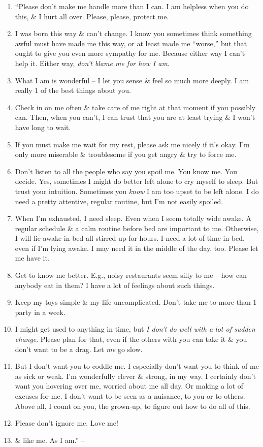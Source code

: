 \documentclass{article}
\numberwithin{equation}{section}
\begin{document}
\begin{enumerate}
	\item ``Please don't make me handle more than I can. I am helpless when you do this, \& I hurt all over. Please, please, protect me.
	\item I was born this way \& can't change. I know you sometimes think something awful must have made me this way, or at least made me ``worse,'' but that ought to give you even more sympathy for me. Because either way I can't help it. Either way, \textit{don't blame me for how I am}.
	\item What I am is wonderful -- I let you sense \& feel so much more deeply. I am really 1 of the best things about you.
	\item Check in on me often \& take care of me right at that moment if you possibly can. Then, when you can't, I can trust that you are at least trying \& I won't have long to wait.
	\item If you must make me wait for my rest, please ask me nicely if it's okay. I'm only more miserable \& troublesome if you get angry \& try to force me.
	\item Don't listen to all the people who say you spoil me. You know me. You decide. Yes, sometimes I might do better left alone to cry myself to sleep. But trust your intuition. Sometimes you \textit{know} I am too upset to be left alone. I do need a pretty attentive, regular routine, but I'm not easily spoiled.
	\item When I'm exhausted, I need sleep. Even when I seem totally wide awake. A regular schedule \& a calm routine before bed are important to me. Otherwise, I will lie awake in bed all stirred up for hours. I need a lot of time in bed, even if I'm lying awake. I may need it in the middle of the day, too. Please let me have it.
	\item Get to know me better. E.g., noisy restaurants seem silly to me -- how can anybody eat in them? I have a lot of feelings about such things.
	\item Keep my toys simple \& my life uncomplicated. Don't take me to more than 1 party in a week.
	\item I might get used to anything in time, but \textit{I don't do well with a lot of sudden change}. Please plan for that, even if the others with you can take it \& you don't want to be a drag. Let \textit{me} go slow.
	\item But I don't want you to coddle me. I especially don't want you to think of me as sick or weak. I'm wonderfully clever \& strong, in my way. I certainly don't want you hovering over me, worried about me all day. Or making a lot of excuses for me. I don't want to be seen as a nuisance, to you or to others. Above all, I count on you, the grown-up, to figure out how to do all of this.
	\item Please don't ignore me. Love me!
	\item \& like me. As I am.'' -- \cite[pp. 95--96]{Aron2013}
\end{enumerate}
\end{document}
